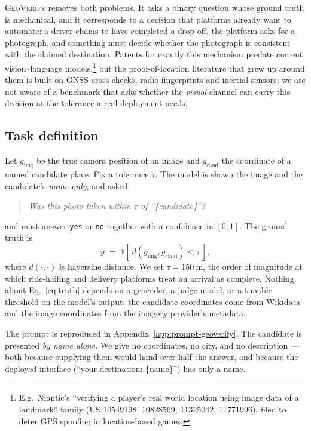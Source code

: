 \documentclass[10pt,a4paper]{article}
\begin{document}
\textsc{GeoVerify} removes both problems. It asks a binary question whose
ground truth is mechanical, and it corresponds to a decision that platforms
already want to automate: a driver claims to have completed a drop-off, the
platform asks for a photograph, and something must decide whether the
photograph is consistent with the claimed destination. Patents for exactly this
mechanism predate current vision--language models,\footnote{E.g.\ Niantic's
``verifying a player's real world location using image data of a landmark''
family (US 10549198, 10828569, 11325042, 11771996), filed to deter GPS spoofing
in location-based games.} but the proof-of-location literature that grew up
around them is built on GNSS cross-checks, radio fingerprints and inertial
sensors; we are not aware of a benchmark that asks whether the \emph{visual}
channel can carry this decision at the tolerance a real deployment needs.

\subsection{Task definition}

Let $g_{\mathrm{img}}$ be the true camera position of an image and
$g_{\mathrm{cand}}$ the coordinate of a named candidate place. Fix a tolerance
$\tau$. The model is shown the image and the candidate's \emph{name only}, and
asked

\begin{quote}
\emph{Was this photo taken within $\tau$ of ``\{candidate\}''?}
\end{quote}

and must answer \texttt{yes} or \texttt{no} together with a confidence in
$[0,1]$. The ground truth is
%
\begin{equation}
y \;=\; \mathbb{1}\!\left[\,d(g_{\mathrm{img}}, g_{\mathrm{cand}}) < \tau \,\right],
\label{eq:truth}
\end{equation}
%
where $d(\cdot,\cdot)$ is haversine distance. We set
$\tau = \SI{150}{\metre}$, the order of magnitude at which ride-hailing and
delivery platforms treat an arrival as complete. Nothing about
Eq.~\ref{eq:truth} depends on a geocoder, a judge model, or a tunable
threshold on the model's output: the candidate coordinates come from Wikidata
and the image coordinates from the imagery provider's metadata.

The prompt is reproduced in Appendix~\ref{app:prompt-geoverify}. The candidate
is presented \emph{by name alone}. We give no coordinates, no
city, and no description --- both because supplying them would hand over half
the answer, and because the deployed interface (``your destination:
\{name\}'') has only a name.
\end{document}
